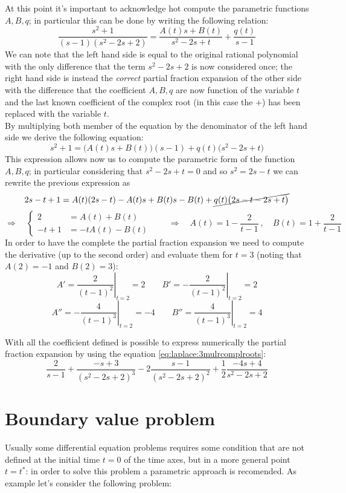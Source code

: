 	At this point it's important to acknowledge hot compute the parametric functions $A,B,q$; in particular this can be done by writing the following relation:
	\[ \frac{s^2+1}{(s-1)(s^2-2s+2)} = \frac{A(t)s+B(t)}{s^2-2s+t} + \frac{q(t)}{s-1} \]
	We can note that the left hand side is equal to the original rational polynomial with the only difference that the term $s^2-2s+2$ is now considered once; the right hand side is instead the \textit{correct} partial fraction expansion of the other side with the difference that the coefficient $A,B,q$ are now function of the variable $t$ and the last known coefficient of the complex root (in this case the $+$) has been replaced with the variable $t$. \\
	By multiplying both member of the equation by the denominator of the left hand side we derive the following equation:
	\[ s^2+1= \Big(A(t)s + B(t)\Big) (s-1) + q(t) \big(s^2-2s+t\big) \]
	This expression allows now us to compute the parametric form of the function $A,B,q$; in particular considering that $s^2-2s+t= 0$ and so $s^2 = 2s-t$ we can rewrite the previous expression as
	\[ 2s-t+1 = A(t)(2s-t) - A(t) s + B(t)s -B(t) + \cancel{q(t) \big(2s-t - 2s +t\big)} \]
	\[\Rightarrow \quad \begin{cases}
		2 & = A(t) + B(t) \\
		-t+1 & =-tA(t) - B(t) 
	\end{cases} \qquad \Rightarrow \quad A(t) = 1 - \frac{2}{t-1} \ , \quad B(t) = 1 + \frac{2}{t-1} \]
	In order to have the complete the partial fraction expansion we need to compute the derivative (up to the second order) and evaluate them for $t=3$ (noting that $A(2) = -1 $ and $B(2) = 3$):
	\[ A' = \left.\frac{2}{(t-1)^2}\right|_{t=2} = 2 \qquad B' =  \left.-\frac{2}{(t-1)^2}\right|_{t=2} = 2 \]
	\[ A'' = \left. -\frac 4{(t-1)^3} \right|_{t=2} = -4 \qquad B'' = \left. \frac 4{(t-1)^3} \right|_{t=2} = 4 \]
	
	With all the coefficient defined is possible to express numerically the partial fraction expansion by using the equation \ref{eq:laplace:3mulrcomplroots}:
	\[ \frac 2 {s-1} + \frac{-s + 3}{(s^2-2s+2)^3} -2 \frac{s-1}{(s^2-2s+2)^2} + \frac 12 \frac{-4s+4}{s^2-2s+2}\]

	

\section{Boundary value problem}
	Usually some differential equation problems requires some condition that are not defined at the initial time $t=0$ of the time axes, but in a more general point $t=t^*$: in order to solve this problem a parametric approach is recomended. As example let's consider the following problem:
	
